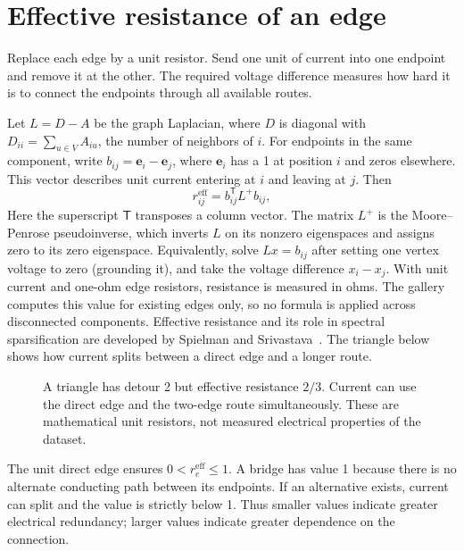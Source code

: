 \documentclass[11pt]{article}
\newcommand{\eff}{r^{\mathrm{eff}}}
\newcommand{\plain}[1]{\noindent #1\par\smallskip}
\begin{document}
\section{Effective resistance of an edge}
\plain{Replace each edge by a unit resistor. Send one unit of current into one endpoint and remove it at the other. The required voltage difference measures how hard it is to connect the endpoints through all available routes.}
Let $L=D-A$ be the graph Laplacian, where $D$ is diagonal with $D_{ii}=\sum_{u\in V}A_{iu}$, the number of neighbors of $i$. For endpoints in the same component, write $b_{ij}=\mathbf e_i-\mathbf e_j$, where $\mathbf e_i$ has a 1 at position $i$ and zeros elsewhere. This vector describes unit current entering at $i$ and leaving at $j$. Then
\begin{equation}
 \eff_{ij}=b_{ij}^{\mathsf T} L^{+}b_{ij},
\end{equation}
Here the superscript $\mathsf T$ transposes a column vector. The matrix $L^{+}$ is the Moore--Penrose pseudoinverse, which inverts $L$ on its nonzero eigenspaces and assigns zero to its zero eigenspace. Equivalently, solve $Lx=b_{ij}$ after setting one vertex voltage to zero (grounding it), and take the voltage difference $x_i-x_j$. With unit current and one-ohm edge resistors, resistance is measured in ohms. The gallery computes this value for existing edges only, so no formula is applied across disconnected components. Effective resistance and its role in spectral sparsification are developed by Spielman and Srivastava~\cite{spielman}. The triangle below shows how current splits between a direct edge and a longer route.
\par
\begin{figure}[H]\centering
{}
\caption{A triangle has detour 2 but effective resistance $2/3$. Current can use the direct edge and the two-edge route simultaneously. These are mathematical unit resistors, not measured electrical properties of the dataset.}
\end{figure}
\par
The unit direct edge ensures $0<\eff_e\leq1$. A bridge has value 1 because there is no alternate conducting path between its endpoints. If an alternative exists, current can split and the value is strictly below 1. Thus smaller values indicate greater electrical redundancy; larger values indicate greater dependence on the connection.
\end{document}
